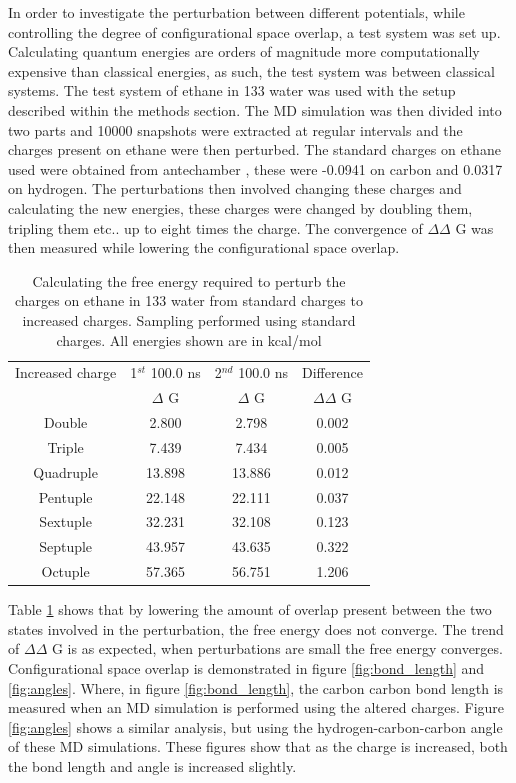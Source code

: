In order to investigate the perturbation between different potentials, while controlling the degree of configurational space overlap, a test system was set up.  Calculating quantum energies are orders of magnitude more computationally expensive than classical energies, as such, the test system was between classical systems.  The test system of ethane in 133 water was used with the setup described within the methods section.  The MD simulation was then divided into two parts and 10000 snapshots were extracted at regular intervals and the charges present on ethane were then perturbed.  The standard charges on ethane used were obtained from antechamber \cite{antechamber}, these were -0.0941 on carbon and 0.0317 on hydrogen. The perturbations then involved changing these charges and calculating the new energies, these charges were changed by doubling them, tripling them etc.. up to eight times the charge.  The convergence of $\Delta \Delta$ G was then measured while lowering the configurational space overlap.


\begin{table}[ht]
 \caption{Calculating the free energy required to perturb the charges on ethane in 133 water from standard charges to increased charges.  Sampling performed using standard charges.  All energies shown are in kcal/mol}
  \begin{center}
  \begin{tabular}{c|c|c|c}
   \hline\hline
 Increased charge & 1$^{st}$ 100.0 ns & 2$^{nd}$ 100.0 ns & Difference \\
 & $\Delta$ G & $\Delta$ G & $\Delta \Delta$ G  \\
\hline
 Double & 2.800 & 2.798 & 0.002 \\
\hline
 Triple & 7.439 & 7.434 & 0.005 \\
\hline
 Quadruple & 13.898 & 13.886 & 0.012 \\
\hline
 Pentuple & 22.148 & 22.111 & 0.037 \\
\hline
 Sextuple & 32.231 & 32.108 & 0.123 \\
\hline
 Septuple & 43.957 & 43.635 & 0.322 \\
\hline
 Octuple & 57.365 & 56.751 & 1.206 \\
  \end{tabular}\label{table:charge_forward}
 \end{center}
\end{table}

Table \ref{table:charge_forward} shows that by lowering the amount of overlap present between the two states involved in the perturbation, the free energy does not converge.  The trend of $\Delta \Delta$ G is as expected, when perturbations are small the free energy converges.  Configurational space overlap is demonstrated in figure \ref{fig:bond_length} and \ref{fig:angles}.  Where, in figure \ref{fig:bond_length}, the carbon carbon bond length is measured when an MD simulation is performed using the altered charges.  Figure \ref{fig:angles} shows a similar analysis, but using the hydrogen-carbon-carbon angle of these MD simulations.  These figures show that as the charge is increased, both the bond length and angle is increased slightly.  


